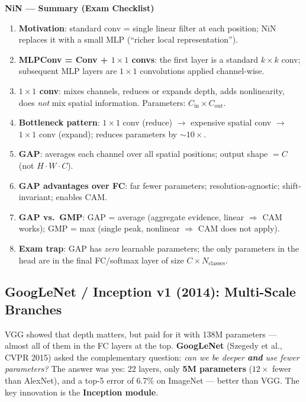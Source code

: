 \documentclass[11pt,a4paper]{article}
\newcommand{\term}[1]{\textcolor{DefGreen}{\textbf{#1}}\index{#1}}
\begin{document}
\begin{tcolorbox}[colback=WarningRedBg,colframe=WarningRed,boxrule=0.8pt,arc=3pt]
\textbf{NiN — Summary (Exam Checklist)}
\begin{enumerate}
  \item \textbf{Motivation}: standard conv = single linear filter at each position; NiN replaces it with a small MLP (``richer local representation'').
  \item \textbf{MLPConv = Conv + $1\times1$ convs}: the first layer is a standard $k\times k$ conv; subsequent MLP layers are $1\times1$ convolutions applied channel-wise.
  \item \textbf{$1\times1$ conv}: mixes channels, reduces or expands depth, adds nonlinearity, does \emph{not} mix spatial information.  Parameters: $C_\text{in}\times C_\text{out}$.
  \item \textbf{Bottleneck pattern}: $1\times1$ conv (reduce) $\to$ expensive spatial conv $\to$ $1\times1$ conv (expand); reduces parameters by $\sim10\times$.
  \item \textbf{GAP}: averages each channel over all spatial positions; output shape $= C$ (not $H\cdot W\cdot C$).
  \item \textbf{GAP advantages over FC}: far fewer parameters; resolution-agnostic; shift-invariant; enables CAM.
  \item \textbf{GAP vs.\ GMP}: GAP = average (aggregate evidence, linear $\Rightarrow$ CAM works); GMP = max (single peak, nonlinear $\Rightarrow$ CAM does not apply).
  \item \textbf{Exam trap}: GAP has \emph{zero} learnable parameters; the only parameters in the head are in the final FC/softmax layer of size $C\times N_\text{classes}$.
\end{enumerate}
\end{tcolorbox}

\subsection{GoogLeNet / Inception v1 (2014): Multi-Scale Branches}
\label{sec:inception}

VGG showed that depth matters, but paid for it with 138M parameters — almost all of them in the
FC layers at the top.  \term{GoogLeNet} (Szegedy et al., CVPR 2015) asked the complementary
question: \emph{can we be deeper \textbf{and} use fewer parameters?}  The answer was yes: 22
layers, only \textbf{5M parameters} ($12\times$ fewer than AlexNet), and a top-5 error of 6.7\%
on ImageNet — better than VGG.  The key innovation is the \term{Inception module}.
\end{document}
